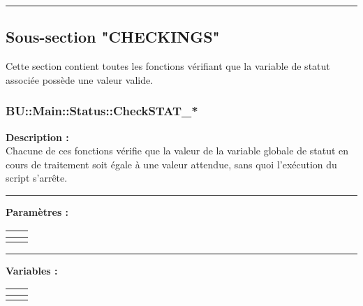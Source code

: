 \documentclass[a4paper,10pt]{article}
\begin{document}
\color{green}\par\noindent\rule{\textwidth}{0.4pt}\color{white}

\color{green}
\subsection{Sous-section "CHECKINGS"}\color{white}

\begin{justify}
    Cette section contient toutes les fonctions vérifiant que la variable de statut associée possède une valeur valide.
\end{justify}

\color{blue}
\subsubsection{\color{mauve}BU::Main::Status::CheckSTAT\_*}\color{white}

\begin{justify}
    \textbf{Description :}\\[1\baselineskip]
    Chacune de ces fonctions vérifie que la valeur de la variable globale de statut en cours de traitement soit égale à une valeur attendue, sans quoi l'exécution du script s'arrête.
\end{justify}\setlength{\parskip}{1em}

\par\noindent\rule{\textwidth}{0.4pt}

\begin{justify}
    \textbf{Paramètres :}\\[1\baselineskip]
    \begin{tabular}{|l|l|}
        \hline
        \textbf{} & \\
        \hline
        \textbf{} & \\
        \hline
    \end{tabular}
\end{justify}

\par\noindent\rule{\textwidth}{0.4pt}

\begin{justify}
    \textbf{Variables :}\\[1\baselineskip]
    \begin{tabular}{|l|l|}
        \hline
        \textbf{} & \\
        \hline
        \textbf{} & \\
        \hline
    \end{tabular}
\end{justify}
\end{document}
